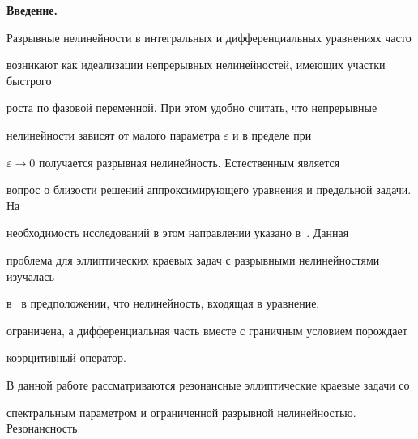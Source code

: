 \date{}




\pagestyle{plain} %







\maketitle


\label{begin}





\setcounter{section}{1}











{\bf Введение.}


Разрывные нелинейности в интегральных и дифференциальных уравнениях часто


возникают как идеализации непрерывных нелинейностей, имеющих участки быстрого


роста по фазовой переменной. При этом удобно считать, что непрерывные


нелинейности зависят от малого параметра $\varepsilon$ и в пределе при


$\varepsilon\to 0$ получается разрывная нелинейность. Естественным является


вопрос о близости решений аппроксимирующего уравнения и предельной задачи. На


необходимость исследований в этом направлении указано в~\cite{krasn2}. Данная


проблема для эллиптических краевых задач с разрывными нелинейностями изучалась


в~\cite{pavl4} в предположении, что нелинейность, входящая в уравнение,


ограничена, а дифференциальная часть вместе с граничным условием порождает


коэрцитивный оператор.





В данной работе рассматриваются резонансные эллиптические краевые задачи со


спектральным параметром и ограниченной разрывной нелинейностью. Резонансность


